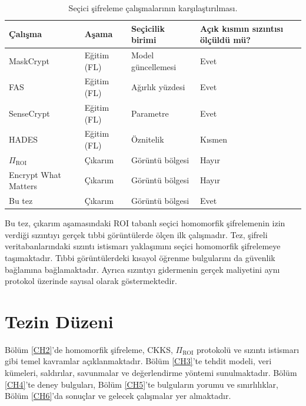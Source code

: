\begin{table}[h!]
{\setlength{\tabcolsep}{6pt}
\caption{Seçici şifreleme çalışmalarının karşılaştırılması.}
\begin{center}
\vspace{-6mm}
\begin{tabular}{llll}
\hline\hline
Çalışma & Aşama & Seçicilik birimi & Açık kısmın sızıntısı ölçüldü mü? \\
\hline
MaskCrypt \cite{hu2025maskcrypt} & Eğitim (FL) & Model güncellemesi & Evet \\
FAS \cite{korkmaz2025fas} & Eğitim (FL) & Ağırlık yüzdesi & Evet \\
SenseCrypt \cite{li2025sensecrypt} & Eğitim (FL) & Parametre & Evet \\
HADES \cite{kaynak2026hades} & Eğitim (FL) & Öznitelik & Kısmen \\
$\Pi_{\mathrm{ROI}}$ \cite{bakas2026roi} & Çıkarım & Görüntü bölgesi & Hayır \\
Encrypt What Matters \cite{backour2026encrypt} & Çıkarım & Görüntü bölgesi & Hayır \\
Bu tez & Çıkarım & Görüntü bölgesi & Evet \\
\hline
\end{tabular}
\vspace{-6mm}
\end{center}
\label{tbl:literatur}}
\end{table}

Bu tez, çıkarım aşamasındaki ROI tabanlı seçici homomorfik şifrelemenin izin verdiği sızıntıyı gerçek tıbbi görüntülerde ölçen ilk çalışmadır. Tez, şifreli veritabanlarındaki sızıntı istismarı yaklaşımını seçici homomorfik şifrelemeye taşımaktadır. Tıbbi görüntülerdeki kısayol öğrenme bulgularını da güvenlik bağlamına bağlamaktadır. Ayrıca sızıntıyı gidermenin gerçek maliyetini aynı protokol üzerinde sayısal olarak göstermektedir.

\section{Tezin Düzeni}\label{duzen}

Bölüm \ref{CH2}'de homomorfik şifreleme, CKKS, $\Pi_{\mathrm{ROI}}$ protokolü ve sızıntı istismarı gibi temel kavramlar açıklanmaktadır. Bölüm \ref{CH3}'te tehdit modeli, veri kümeleri, saldırılar, savunmalar ve değerlendirme yöntemi sunulmaktadır. Bölüm \ref{CH4}'te deney bulguları, Bölüm \ref{CH5}'te bulguların yorumu ve sınırlılıklar, Bölüm \ref{CH6}'da sonuçlar ve gelecek çalışmalar yer almaktadır.
